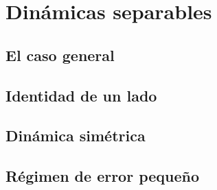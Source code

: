 \section{Dinámicas separables}

\subsection{El caso general}

\subsection{Identidad de un lado}

\subsection{Dinámica simétrica}

\subsection{Régimen de error pequeño}
